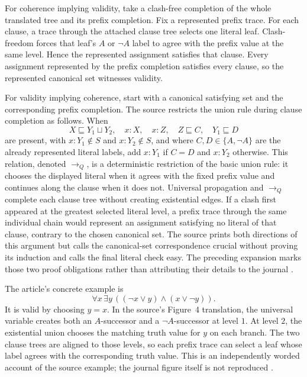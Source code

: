 For coherence implying validity, take a clash-free completion of the whole
translated tree and its prefix completion.  Fix a represented prefix trace.
For each clause, a trace through the attached clause tree selects one literal
leaf.  Clash-freedom forces that leaf's \(A\) or \(\neg A\) label to agree with
the prefix value at the same level.  Hence the represented assignment satisfies
that clause.  Every assignment represented by the prefix completion satisfies
every clause, so the represented canonical set witnesses validity.

For validity implying coherence, start with a canonical satisfying set and the
corresponding prefix completion.  The source restricts the union rule during
clause completion as follows.  When
\[
 X\sqsubseteq Y_1\sqcup Y_2,\quad
 x:X,\quad x:Z,\quad Z\sqsubseteq C,\quad Y_1\sqsubseteq D
\]
are present, with \(x:Y_1\notin S\) and \(x:Y_2\notin S\), and where
\(C,D\in\{A,\neg A\}\) are the already represented literal labels, add
\(x:Y_1\) if \(C=D\) and \(x:Y_2\) otherwise.  This relation, denoted
\(\to_Q\), is a deterministic restriction of the basic union rule: it chooses
the displayed literal when it agrees with the fixed prefix value and continues
along the clause when it does not.  Universal propagation and \(\to_Q\)
complete each clause tree without creating existential edges.
If a clash first appeared at the greatest selected literal level, a prefix
trace through the same individual chain would represent an assignment
satisfying no literal of that clause, contrary to the chosen canonical set.
The source prints both directions of this argument but calls the canonical-set
correspondence crucial without proving its induction and calls the final
literal check easy.  The preceding expansion marks those two proof obligations
rather than attributing their details to the journal
\cite[Lem.~6.2, pp.~20--21]{SchmidtSchaussSmolka1991}.

The article's concrete example is
\[
 \forall x\,\exists y\,
 ((\neg x\lor y)\land(x\lor\neg y)).
\]
It is valid by choosing \(y=x\).  In the source's Figure~4 translation, the
universal variable creates both an \(A\)-successor and a \(\neg A\)-successor
at level \(1\).  At level \(2\), the existential union chooses the matching
truth value for \(y\) on each branch.  The two clause trees are aligned to
those levels, so each prefix trace can select a leaf whose label agrees with
the corresponding truth value.  This is an independently worded account of
the source example; the journal figure itself is not reproduced
\cite[Fig.~4, pp.~18--19]{SchmidtSchaussSmolka1991}.

